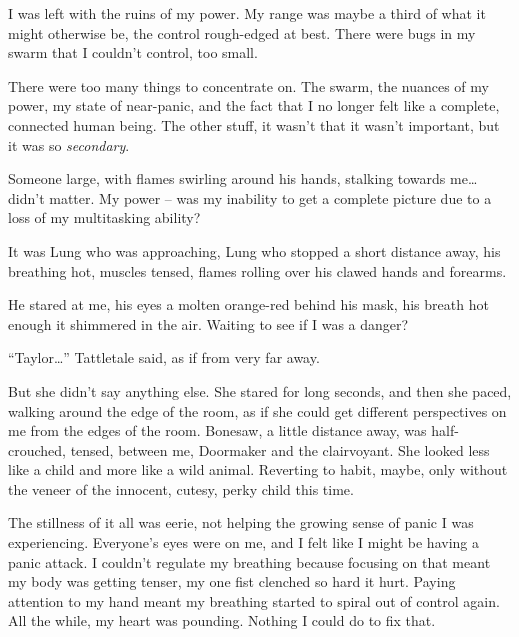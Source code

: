 I was left with the ruins of my power.  My range was maybe a third of what it might otherwise be, the control rough-edged at best.  There were bugs in my swarm that I couldn't control, too small.



There were too many things to concentrate on.  The swarm, the nuances of my power, my state of near-panic, and the fact that I no longer felt like a complete, connected human being.  The other stuff, it wasn't that it wasn't important, but it was so \emph{secondary}.



Someone large, with flames swirling around his hands, stalking towards me\ldots didn't matter.  My power – was my inability to get a complete picture due to a loss of my multitasking ability?



It was Lung who was approaching, Lung who stopped a short distance away, his breathing hot, muscles tensed, flames rolling over his clawed hands and forearms.



He stared at me, his eyes a molten orange-red behind his mask, his breath hot enough it shimmered in the air.  Waiting to see if I was a danger?



``Taylor\ldots'' Tattletale said, as if from very far away.



But she didn't say anything else.  She stared for long seconds, and then she paced, walking around the edge of the room, as if she could get different perspectives on me from the edges of the room.  Bonesaw, a little distance away, was half-crouched, tensed, between me, Doormaker and the clairvoyant.  She looked less like a child and more like a wild animal.  Reverting to habit, maybe, only without the veneer of the innocent, cutesy, perky child this time.



The stillness of it all was eerie, not helping the growing sense of panic I was experiencing.  Everyone's eyes were on me, and I felt like I might be having a panic attack.  I couldn't regulate my breathing because focusing on that meant my body was getting tenser, my one fist clenched so hard it hurt.  Paying attention to my hand meant my breathing started to spiral out of control again.  All the while, my heart was pounding.  Nothing I could do to fix that.



